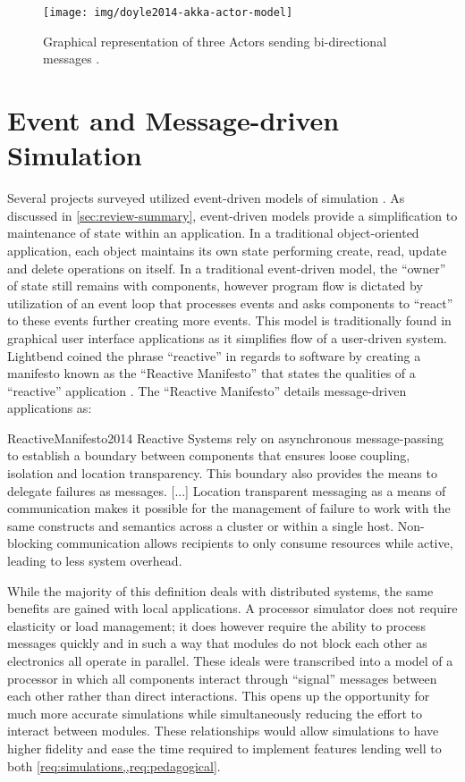 \begin{figure}[bh!]
    \centering
    \texttt{[image: img/doyle2014-akka-actor-model]}
    \caption{Graphical representation of three Actors sending bi-directional messages \cite{DoyleAkka2014}.}
    \label{fig:doyle2014-akka-actor-model}
\end{figure} 

\section{Event and Message-driven Simulation}

Several projects surveyed utilized event-driven models of simulation \cite{Nakamura2013, McLoughlin2010, Garcia2009}. As discussed in \cref{sec:review-summary}, event-driven models provide a simplification to maintenance of state within an application. In a traditional object-oriented application, each object maintains its own state performing create, read, update and delete operations on itself. In a traditional event-driven model, the ``owner'' of state still remains with components, however program flow is dictated by utilization of an event loop that processes events and asks components to ``react'' to these events further creating more events. This model is traditionally found in graphical user interface applications as it simplifies flow of a user-driven system. Lightbend coined the phrase ``reactive'' in regards to software by creating a manifesto known as the ``Reactive Manifesto'' that states the qualities of a ``reactive'' application \cite{ReactiveManifesto2014}. The ``Reactive Manifesto'' details message-driven applications as: 
\begin{displaycquote}{ReactiveManifesto2014}
    Reactive Systems rely on asynchronous message-passing to establish a boundary between components that ensures loose coupling, isolation and location transparency. This boundary also provides the means to delegate failures as messages. [...] Location transparent messaging as a means of communication makes it possible for the management of failure to work with the same constructs and semantics across a cluster or within a single host. Non-blocking communication allows recipients to only consume resources while active, leading to less system overhead.
\end{displaycquote}
While the majority of this definition deals with distributed systems, the same benefits are gained with local applications. A processor simulator does not require elasticity or load management; it does however require the ability to process messages quickly and in such a way that modules do not block each other as electronics all operate in parallel. These ideals were transcribed into a model of a processor in which all components interact through ``signal'' messages between each other rather than direct interactions. This opens up the opportunity for much more accurate simulations while simultaneously reducing the effort to interact between modules. These relationships would allow simulations to have higher fidelity and ease the time required to implement features lending well to both \cref{req:simulations,,req:pedagogical}. 

